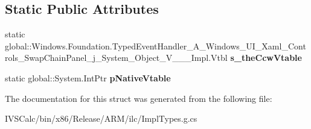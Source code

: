 \subsection*{Static Public Attributes}
\begin{DoxyCompactItemize}
\item 
\mbox{\label{struct_windows_1_1_foundation_1_1_typed_event_handler___a___windows___u_i___xaml___controls___swe8a58bc0b25f8af5f9c8249e14c85158_a94f3caa4bd95de462bf2bc7bbfe57ffc}} 
static global\+::\+Windows.\+Foundation.\+Typed\+Event\+Handler\+\_\+\+A\+\_\+\+Windows\+\_\+\+U\+I\+\_\+\+Xaml\+\_\+\+Controls\+\_\+\+Swap\+Chain\+Panel\+\_\+j\+\_\+\+System\+\_\+\+Object\+\_\+\+V\+\_\+\+\_\+\+\_\+\+Impl.\+Vtbl {\bfseries s\+\_\+the\+Ccw\+Vtable}
\item 
\mbox{\label{struct_windows_1_1_foundation_1_1_typed_event_handler___a___windows___u_i___xaml___controls___swe8a58bc0b25f8af5f9c8249e14c85158_a41a35750309c3252202769558e1a6d52}} 
static global\+::\+System.\+Int\+Ptr {\bfseries p\+Native\+Vtable}
\end{DoxyCompactItemize}


The documentation for this struct was generated from the following file\+:\begin{DoxyCompactItemize}
\item 
I\+V\+S\+Calc/bin/x86/\+Release/\+A\+R\+M/ilc/Impl\+Types.\+g.\+cs\end{DoxyCompactItemize}
